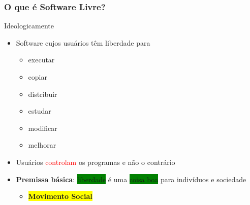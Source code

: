 \documentclass[xcolor=dvipsnames]{beamer}
\newcommand{\tred}[1]{\textcolor{red}{#1}}
\newcommand{\byellow}[1]{\colorbox{yellow}{#1}}
\newcommand{\bgreen}[1]{\colorbox{green}{#1}}
\begin{document}
\begin{frame}
	\frametitle{O que é Software Livre?}
	\begin{block}{Ideologicamente}
		  \begin{itemize}
		    \item Software cujos usuários têm liberdade para 
		    \begin{itemize}
		      \item executar
		      \item copiar
		      \item distribuir
		      \item estudar
		      \item modificar
    		      \item melhorar
		    \end{itemize}
		    \vspace{0.2cm}
		    \item Usuários \tred{controlam} os programas e não o 
contrário
		    \item {\bf Premissa básica}: \bgreen{liberdade} é uma 
\bgreen{coisa boa} para indivíduos e sociedade		    

\begin{itemize}
		    \item \byellow{\textbf{Movimento 
Social}}
		    \end{itemize}
		  \end{itemize}
	\end{block}
\end{frame}
\end{document}
